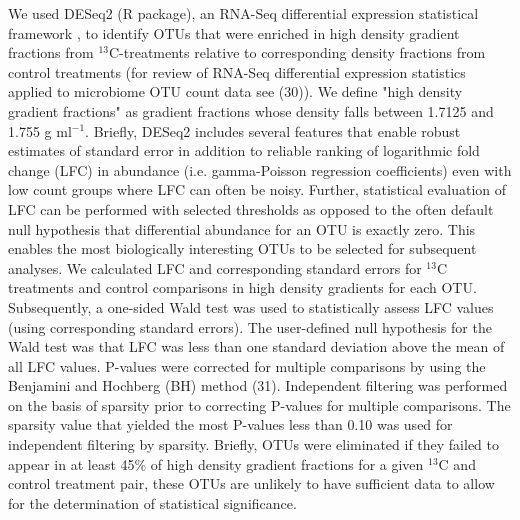 We used DESeq2 (R package), an RNA-Seq differential expression statistical
framework \citep{love2014}, to identify OTUs that were enriched in high
density gradient fractions from $^{13}$C-treatments relative to corresponding
density fractions from control treatments (for review of RNA-Seq differential
expression statistics applied to microbiome OTU count data see (30)). We define
"high density gradient fractions" as gradient fractions whose density falls
between 1.7125 and 1.755 g ml$^{-1}$. Briefly, DESeq2 includes several features that
enable robust estimates of standard error in addition to reliable ranking of
logarithmic fold change (LFC) in abundance (i.e. gamma-Poisson regression
coefficients) even with low count groups where LFC can often be noisy.
Further, statistical evaluation of LFC can be performed with selected
thresholds as opposed to the often default null hypothesis that differential
abundance for an OTU is exactly zero. This enables the most biologically
interesting OTUs to be selected for subsequent analyses. We calculated LFC and
corresponding standard errors for $^{13}$C treatments and control comparisons
in high density gradients for each OTU. Subsequently, a one-sided Wald test was
used to statistically assess LFC values (using corresponding standard errors).
The user-defined null hypothesis for the Wald test was that LFC was less than
one standard deviation above the mean of all LFC values. P-values were
corrected for multiple comparisons by using the Benjamini and Hochberg (BH)
method (31). Independent filtering was performed on the basis of sparsity prior
to correcting P-values for multiple comparisons. The sparsity value that
yielded the most P-values less than 0.10 was used for independent filtering by
sparsity. Briefly, OTUs were eliminated if they failed to appear in at least
45\% of high density gradient fractions for a given $^{13}$C and control
treatment pair, these OTUs are unlikely to have sufficient data to allow for
the determination of statistical significance.
